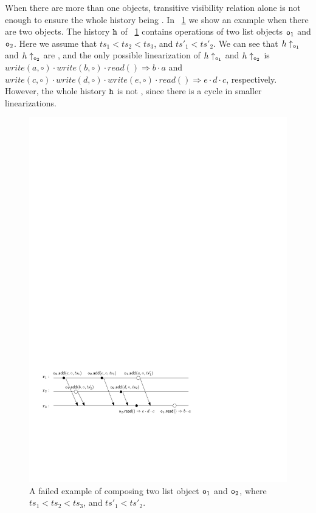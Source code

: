 When there are more than one \tonelinearizable{} objects, transitive visibility relation alone is not enough to ensure the whole history being \crdtlinearizable{}. In \figurename~\ref{fig:a failed example of composing two last-write-win registers} we show an example when there are two \tonelinearizable{} objects. The history $\mathtt{h}$ of \figurename~\ref{fig:a failed example of composing two last-write-win registers} contains operations of two list objects $\mathtt{o}_1$ and $\mathtt{o}_2$. Here we assume that $\mathit{ts}_1 < \mathit{ts}_2 < \mathit{ts}_3$, and $\mathit{ts}'_1 < \mathit{ts}'_2$. We can see that $h \uparrow_{\mathtt{o}_1}$ and $h \uparrow_{\mathtt{o}_2}$ are \crdtlinearizable, and the only possible linearization of $h \uparrow_{\mathtt{o}_1}$ and $h \uparrow_{\mathtt{o}_2}$ is $\mathit{write}(a,\circ) \cdot \mathit{write}(b,\circ) \cdot \mathit{read}() \Rightarrow b \cdot a$ and $\mathit{write}(c,\circ) \cdot \mathit{write}(d,\circ) \cdot \mathit{write}(e,\circ) \cdot \mathit{read}() \Rightarrow e \cdot d \cdot c$, respectively. However, the whole history $\mathtt{h}$ is not \crdtlinearizable, since there is a cycle in smaller linearizations.


\begin{figure}[t]
  \centering
  \includegraphics[width=0.7 \textwidth]{figures/LWWReg-LWWReg-NoSTS.pdf}
\vspace{-10pt}
  \caption{A failed example of composing two \tonelinearizable list object $\mathtt{o}_1$ and $\mathtt{o}_2$, where $\mathit{ts}_1 < \mathit{ts}_2 < \mathit{ts}_3$, and $\mathit{ts}'_1 < \mathit{ts}'_2$.}
  \label{fig:a failed example of composing two last-write-win registers}
\end{figure}


